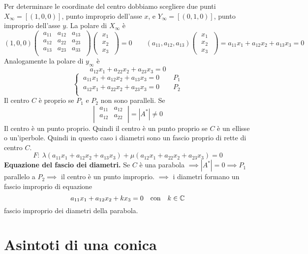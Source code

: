 \documentclass{report}
\begin{document}
Per determinare le coordinate del centro dobbiamo scegliere due punti \(X_{\infty} = [(1, 0, 0)]\), punto improprio dell'asse \(x\), e \(Y_{\infty} = [(0,1,0)]\), punto improprio dell'asse \(y\). La polare di \(X_{\infty}\) è \[
    (1,0,0)
\left( \; \begin{matrix}
    a_{11} & a_{12} & a_{13} \\
    a_{12} & a_{22} & a_{23} \\
    a_{13} & a_{23} & a_{33} \\
\end{matrix} \; \right)
\left( \; \begin{matrix} x_1 \\ x_2\\ x_3 \end{matrix} \; \right) = 0 \qquad (a_{11}, a_{12}, a_{13}) \left( \; \begin{matrix} x_1 \\ x_2\\ x_3 \end{matrix} \; \right) = a_{11}x_1+a_{12}x_2 + a_{13} x_3 = 0
\] Analogamente la polare di \(y_{\infty}\) è  \[
a_{12}x_1 + a_{22}x_2 + a_{23}x_3 = 0
\] \[
\begin{cases}
    \ a_{11}x_1+a_{12}x_2+a_{13}x_3 = 0 \qquad P_1 \\
    \ a_{12}x_1+a_{22}x_2+a_{23}x_3=0 \qquad P_2 \\
\end{cases}
\] 
Il centro \(C\) è proprio se \(P_1\) e \(P_2\) non sono paralleli. Se \[
\left| \; \begin{matrix}
    a_{11} & a_{12} \\
    a_{12} & a_{22} \\
\end{matrix} \; \right| = |A^{*}| \neq 0
\] Il centro è un punto proprio. Quindi il centro è un punto proprio se \(C\) è un ellisse o un'iperbole. Quindi in questo caso i diametri sono un fascio proprio di rette di centro \(C\). \[
F: \ \lambda (a_{11}x_1+a_{12}x_2+a_{13}x_3) + \mu (a_{12}x_1 + a_{22}x_2 + a_{23}x_3) = 0
\] \textbf{Equazione del fascio dei diametri.} Se \(C\) è una parabola \(\implies |A^{*}| = 0 \implies P_1 \) parallelo a \(P_2 \implies  \) il centro è un punto improprio. \(\implies \) i diametri formano un fascio improprio di equazione \[
a_{11}x_1+a_{12}x_2 + kx_3 = 0 \quad \text{con} \quad k \in \CC
\] fascio improprio dei diametri della parabola.

\section{Asintoti di una conica}
\end{document}
